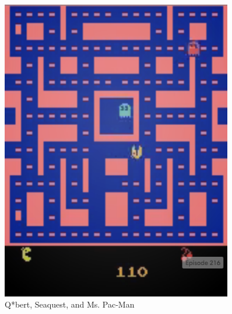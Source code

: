 \documentclass[final]{beamer}
\newlength{\sepwid}
\newlength{\onecolwid}
\newlength{\twocolwid}
\begin{document}
\begin{frame}[t]
\begin{columns}[t]
\begin{column}{\onecolwid}
\begin{figure}[h]
\begin{minipage}{0.8\textwidth}
        \centering
        \includegraphics[scale=0.5]{MsPacman}
    \end{minipage}
    \caption{Q*bert, Seaquest, and Ms. Pac-Man}
\end{figure}


\end{column} %

\begin{column}{\sepwid}\end{column} %

\begin{column}{\twocolwid} %

\begin{columns}[t,totalwidth=\twocolwid] %

\begin{column}{\onecolwid}\vspace{-.6in} %


\end{column}
\end{columns}
\end{column}
\end{columns}
\end{frame}
\end{document}
